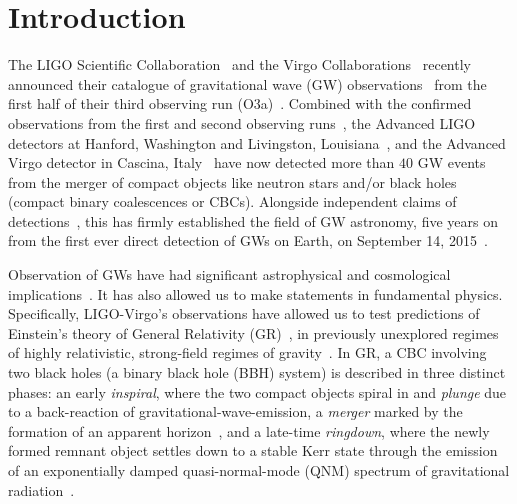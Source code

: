 \documentclass[twocolumn,prd,superscriptaddress,amsfonts,amssymb,amsmath,preprintnumbers]{revtex4-1}
\begin{document}
\maketitle


\section{Introduction}\label{sec:intro}

The LIGO Scientific Collaboration~\citep{lsc} and the Virgo Collaborations~\citep{Virgo} recently announced their catalogue of gravitational wave (GW) observations~\citep{GWTC-2} from the first half of their third observing run (O3a)~\citep{O3reference}. Combined with the confirmed observations from the first and second observing runs~\citep{abbott2019gwtc}, the Advanced LIGO detectors at Hanford, Washington and Livingston, Louisiana~\citep{aasi2015characterization}, and the Advanced Virgo detector in Cascina, Italy~\citep{acernese2014advanced} have now detected more than $40$ GW events from the merger of compact objects like neutron stars and/or black holes (compact binary coalescences or CBCs). Alongside independent claims of detections~\citep{nitz20191,nitz20202,2019PhRvD.100b3007Z,2020PhRvD.101h3030V,Venumadhav_2020}, this has firmly established the field of GW astronomy, five years on from the first ever direct detection of GWs on Earth, on September 14, 2015~\citep{abbott2016observation}.
\par
Observation of GWs have had significant astrophysical and cosmological implications~\citep{LSC_2016astroph,gw170817_mma,gw170817_joint,gw170817_hubble}. It has also allowed us to make statements in fundamental physics. Specifically, LIGO-Virgo's observations have allowed us to test predictions of Einstein's theory of General Relativity (GR)~\citep[GR]{}, in previously unexplored regimes of highly relativistic, strong-field regimes of gravity~\citep{LSC_2016grtests,GW170817_TGR,gwtc1_tgr}. In GR, a CBC involving two black holes (a binary black hole (BBH) system) is described in three distinct phases: an early \textit{inspiral}, where the two compact objects spiral in and \textit{plunge} due to a back-reaction of gravitational-wave-emission, a \textit{merger} marked by the formation of an apparent horizon~\citep{NRpaper}, and a late-time \textit{ringdown}, where the newly formed remnant object settles down to a stable Kerr state through the emission of an exponentially damped quasi-normal-mode (QNM) spectrum of gravitational radiation~\citep{vishu,earlyqnmpapers}.  
\end{document}
